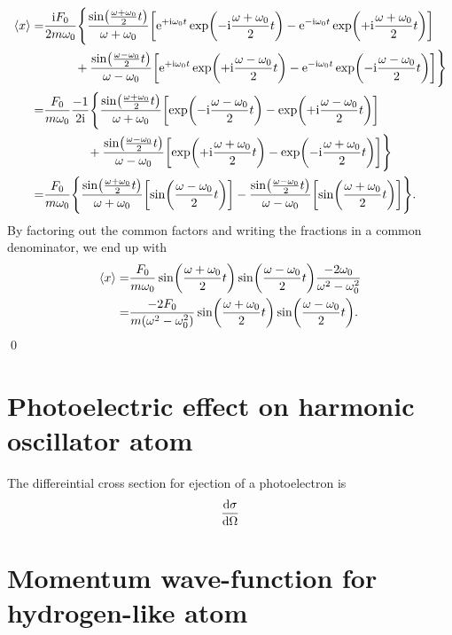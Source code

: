 \documentclass[11pt,letter, swedish, english
]{article}
\begin{document}
\begin{equation}
\begin{aligned}
\ev{x}=&\frac{\ii F_0}{2 m\omega_0}\Bigg\{
\frac{\sin(\frac{\omega+\omega_0}{2}t)}
{\omega+\omega_0}
\qty[
\ee^{+\ii\omega_0t}\exp(-\ii\frac{\omega+\omega_0}{2}t)-
\ee^{-\ii\omega_0t}\exp(+\ii\frac{\omega+\omega_0}{2}t)
] \\ & \hspace{25pt}
+\frac{\sin(\frac{\omega-\omega_0}{2}t)}
{\omega-\omega_0}
\qty[\ee^{+\ii\omega_0t}\exp(+\ii\frac{\omega-\omega_0}{2}t)
-\ee^{-\ii\omega_0t}\exp(-\ii\frac{\omega-\omega_0}{2}t)
]
\Bigg\}\\
=&\frac{F_0}{m\omega_0}\frac{-1}{2\ii}\Bigg\{
\frac{\sin(\frac{\omega+\omega_0}{2}t)}
{\omega+\omega_0}
\qty[
\exp(-\ii\frac{\omega-\omega_0}{2}t)-
\exp(+\ii\frac{\omega-\omega_0}{2}t)
] \\ & \hspace{35pt}
+\frac{\sin(\frac{\omega-\omega_0}{2}t)}
{\omega-\omega_0}
\qty[\exp(+\ii\frac{\omega+\omega_0}{2}t)
-\exp(-\ii\frac{\omega+\omega_0}{2}t)
]
\Bigg\}\\
=&\frac{F_0}{m\omega_0}
\Bigg\{
\frac{\sin(\frac{\omega+\omega_0}{2}t)}
{\omega+\omega_0}
\qty[ \sin(\frac{\omega-\omega_0}{2}t) ] 
-\frac{\sin(\frac{\omega-\omega_0}{2}t)}
{\omega-\omega_0}
\qty[\sin(\frac{\omega+\omega_0}{2}t)
] \Bigg\}.\\
\end{aligned}
\end{equation}
By factoring out the common factors and writing the fractions in a
common denominator, we end up with
\begin{equation}
\begin{aligned}
\ev{x}=&\frac{F_0}{m\omega_0}
\sin(\frac{\omega+\omega_0}{2}t)
\sin(\frac{\omega-\omega_0}{2}t)
\frac{-2\omega_0}{\omega^2-\omega_0^2}\\
=&\frac{-2F_0}{m\qty(\omega^2-\omega_0^2)}
\sin(\frac{\omega+\omega_0}{2}t)
\sin(\frac{\omega-\omega_0}{2}t).
\end{aligned}
\end{equation}
\qed



\section{Photoelectric effect on harmonic oscillator atom}
The differeintial cross section for ejection of a photoelectron is
\begin{equation}
\dv{\sigma}{\Omega}
\end{equation}

\section{Momentum wave-function for hydrogen-like atom}
\end{document}

